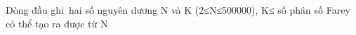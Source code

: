 Dòng đầu ghi hai số nguyên dương N và K (2≤N≤500000), K≤ số phân số Farey có thể tạo ra được từ N  

\